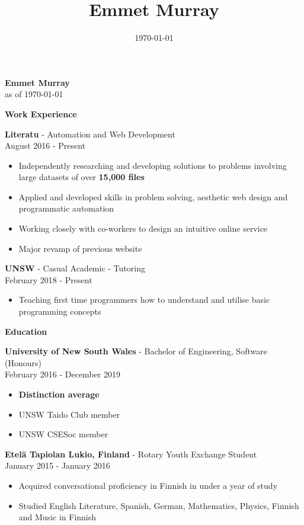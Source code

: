 \documentclass[a4paper]{article}
\title{\textbf{Emmet Murray}}
\date{\today}
\newcommand{\minititle}[1]{{\Large \begin{center} \textbf{#1} \end{center}} \vspace{0.2cm}}
\newcommand{\resumeEntry}[3]{{\large \textbf{#1} - #2} \\ \small{#3} }
\begin{document}
 

\begin{minipage}[t]{0.6\linewidth}   
    {
        \begin{center}
            { \Huge \textbf{Emmet Murray}} \\
            \vspace{0.4cm}
            as of \today
        \end{center}
        \minititle{Work Experience}
        \resumeEntry{Literatu}{Automation and Web Development}{August 2016 - Present}
        \begin{itemize}
            \setlength\itemsep{0.03cm}
            \item Independently researching and developing solutions to problems involving large datasets of over \textbf{15,000 files}
            \item Applied and developed skills in problem solving, aesthetic web design and programmatic automation
            \item Working closely with co-workers to design an intuitive online service
            \item Major revamp of previous website
        \end{itemize}
        \vspace{0.3cm}
        \resumeEntry{UNSW}{Casual Academic - Tutoring}{February 2018 - Present}
        \begin{itemize}
            \setlength\itemsep{0.03cm}
            \item Teaching first time programmers how to understand and utilise basic programming concepts
        \end{itemize}
    }
    {
        \vspace{0.1cm}
        \minititle{Education}
        \resumeEntry{University of New South Wales}{Bachelor of Engineering, Software (Honours)}{February 2016 - December 2019}
        \begin{itemize}
            \setlength\itemsep{0.03cm}
            \item \textbf{Distinction average}
            \item UNSW Taido Club member
            \item UNSW CSESoc member
        \end{itemize}
        \vspace{0.4cm}
        \resumeEntry{Etel{\"a} Tapiolan Lukio, Finland}{Rotary Youth Exchange Student}{January 2015 - January 2016}
        \begin{itemize}
            \setlength\itemsep{0.03cm}
            \item Acquired conversational proficiency in Finnish in under a year of study
            \item Studied English Literature, Spanish, German, Mathematics, Physics, Finnish and Music in Finnish


\end{itemize}}
\end{minipage}
\end{document}
